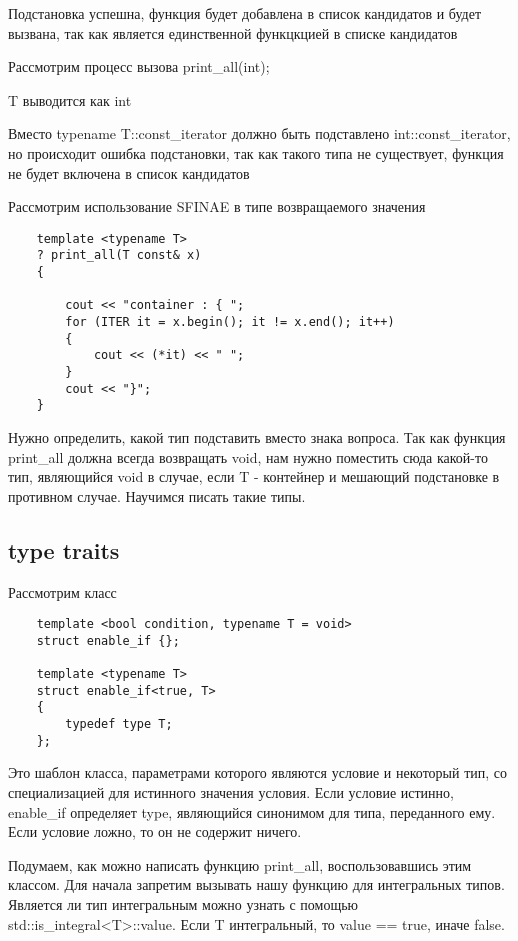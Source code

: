 	Подстановка успешна, функция будет добавлена в список кандидатов и будет вызвана, так как является единственной функцкцией в списке кандидатов
	
	
	Рассмотрим процесс вызова print\_all(int);
		
	T выводится как int
		
	Вместо typename T::const\_iterator должно быть подставлено int::const\_iterator, но происходит ошибка подстановки, так как такого типа не существует, функция не будет включена в список кандидатов
	
	Рассмотрим использование SFINAE в типе возвращаемого значения
	
	\begin{verbatim}
	template <typename T>
	? print_all(T const& x)
	{

	    cout << "container : { ";
	    for (ITER it = x.begin(); it != x.end(); it++)
	    {
	        cout << (*it) << " ";
	    } 
	    cout << "}";
	}
	\end{verbatim}
	
	Нужно определить, какой тип подставить вместо знака вопроса. Так как функция print\_all должна всегда возвращать void, нам нужно поместить сюда какой-то тип, являющийся void в случае, если T - контейнер и мешающий подстановке в противном случае. Научимся писать такие типы.
	
	\subsection{type traits}
	
	Рассмотрим класс
	
	\begin{verbatim}
	template <bool condition, typename T = void>
	struct enable_if {};
 
	template <typename T>
	struct enable_if<true, T>
	{
	    typedef type T;
	};
	\end{verbatim}
	
	Это шаблон класса, параметрами которого являются условие и некоторый тип, со специализацией для истинного значения условия. Если условие истинно, enable\_if определяет type, являющийся синонимом для типа, переданного ему. Если условие ложно, то он не содержит ничего. 
	
	Подумаем, как можно написать функцию print\_all, воспользовавшись этим классом. Для начала запретим вызывать нашу функцию для интегральных типов. Является ли тип интегральным можно узнать с помощью std::is\_integral<T>::value. Если T интегральный, то value == true, иначе false.

